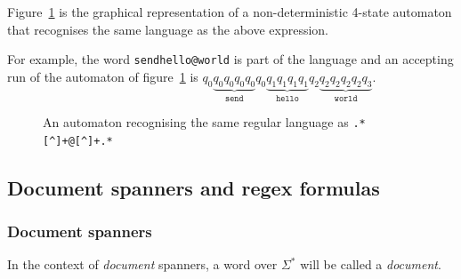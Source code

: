 \documentclass[12px]{article}
\theoremstyle{definition}
\begin{document}
        Figure~\ref{fig:automata_simple} is the graphical representation of a
        non-deterministic 4-state automaton that recognises the same language
        as the above expression.

        For example, the word \texttt{send{\textvisiblespace}hello@world} is
        part of the language and an accepting run of the automaton of
        figure~\ref{fig:automata_simple} is $q_0 \underbrace{q_0 q_0 q_0
        q_0}_\texttt{send} q_0 \underbrace{q_1q_1q_1q_1}_\texttt{hello} q_2
        \underbrace{q_2 q_2 q_2 q_2 q_3}_\texttt{world}$.

        \begin{figure}[ht]
          \centering
          \caption{%
            An automaton recognising the same regular language as
            \texttt{.*[\textasciicircum\textvisiblespace]+@[\textasciicircum\textvisiblespace]+.*}
          }%
          \label{fig:automata_simple}
        \end{figure}

    \subsection{Document spanners and regex formulas}

      \subsubsection{Document spanners}

        In the context of \textit{document} spanners, a word over $\Sigma^*$
        will be called a \textit{document}.
\end{document}
